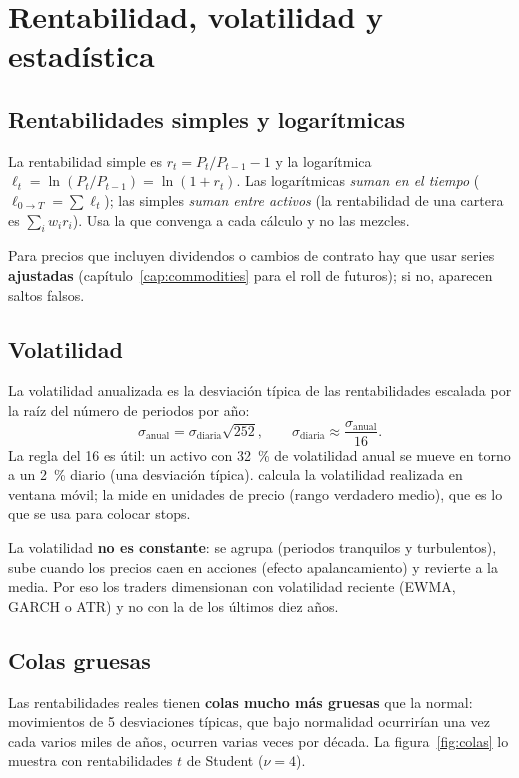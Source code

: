\chapter{Rentabilidad, volatilidad y estadística}\label{cap:estadistica}

\section{Rentabilidades simples y logarítmicas}
La rentabilidad simple es $r_t = P_t/P_{t-1}-1$ y la logarítmica $\ell_t = \ln(P_t/P_{t-1}) = \ln(1+r_t)$.
Las logarítmicas \emph{suman en el tiempo} ($\ell_{0\to T} = \sum \ell_t$); las simples \emph{suman entre
activos} (la rentabilidad de una cartera es $\sum_i w_i r_i$). Usa la que convenga a cada cálculo y no
las mezcles.

Para precios que incluyen dividendos o cambios de contrato hay que usar series \textbf{ajustadas}
(capítulo~\ref{cap:commodities} para el roll de futuros); si no, aparecen saltos falsos.

\section{Volatilidad}
La volatilidad anualizada es la desviación típica de las rentabilidades escalada por la raíz del
número de periodos por año:
\begin{equation}
\sigma_{\text{anual}} = \sigma_{\text{diaria}}\sqrt{252},\qquad \sigma_{\text{diaria}}\approx \frac{\sigma_{\text{anual}}}{16}.
\end{equation}
La regla del 16 es útil: un activo con 32~\% de volatilidad anual se mueve en torno a un 2~\% diario
(una desviación típica).  calcula la volatilidad realizada en
ventana móvil;  la mide en unidades de precio (rango verdadero medio), que es
lo que se usa para colocar stops.

La volatilidad \textbf{no es constante}: se agrupa (periodos tranquilos y turbulentos), sube cuando los
precios caen en acciones (efecto apalancamiento) y revierte a la media. Por eso los traders
dimensionan con volatilidad reciente (EWMA, GARCH o ATR) y no con la de los últimos diez años.

\section{Colas gruesas}
Las rentabilidades reales tienen \textbf{colas mucho más gruesas} que la normal: movimientos de 5
desviaciones típicas, que bajo normalidad ocurrirían una vez cada varios miles de años, ocurren varias
veces por década. La figura~\ref{fig:colas} lo muestra con rentabilidades $t$ de Student ($\nu=4$).

